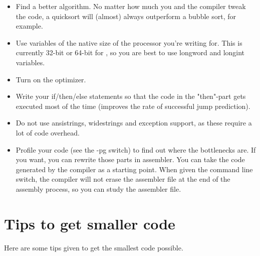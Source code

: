 \begin{itemize}
\item Find a better algorithm. No matter how much you and the compiler
tweak the code, a quicksort will (almost) always outperform a bubble
sort, for example.

\item Use variables of the native size of the processor you're writing
for. This is currently 32-bit or 64-bit for \fpc, so you are best to
use longword and longint variables.

\item Turn on the optimizer.

\item Write your if/then/else statements so that the code in the "then"-part
gets executed most of the time (improves the rate of successful jump prediction).

\item Do not use ansistrings, widestrings and exception support, as these 
require a lot of code overhead.

\item Profile your code (see the -pg switch) to find out where the
bottlenecks are. If you want, you can rewrite those parts in assembler.
You can take the code generated by the compiler as a starting point. When
given the  command line switch, the compiler will not erase the
assembler file at the end of the assembly process, so you can study the
assembler file.

\end{itemize}

\section{Tips to get smaller code}
Here are some tips given to get the smallest code possible.

